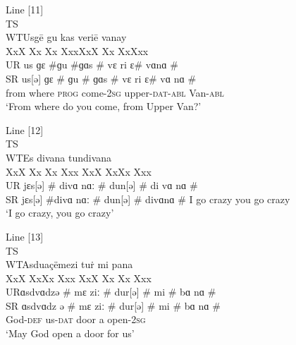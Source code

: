 \documentclass[output=paper,colorlinks,citecolor=brown]{langscibook}
\begin{document}
\begin{paperappendix}
\newpage
\noindent Line [11]\\
TS\tab   {} \\
WT\tab   Usgē \tab  \tab     gu \tab  kas \tab  \tab   veriē \tab \tab      vanay\\
\tab \tab XxX   \tab  Xx \tab  Xx \tab  Xxx\tab  \tab    XxX   \tab   Xx  \tab Xx\tab   Xxx\\ 
UR \tab  us \tab     ɡɛ \#\tab   ɡu \#\tab   ɡɑs \#  \tab   \tab  vɛ ri \tab    ɛ\# \tab  vɑ\tab   nɑ \#\\
SR \tab  us[ə] \tab     ɡɛ \# \tab  ɡu \# \tab  ɡɑs \# \tab  \tab    vɛ ri \tab    ɛ\# \tab  vɑ \tab  nɑ \#\\
\tab \tab from where \tab    \textsc{prog} \tab  come-2\textsc{sg} \tab  upper-\textsc{dat-abl} \tab  Van-\textsc{abl}\\
‘From where do you come, from Upper Van?'\medskip

\noindent Line [12]\\
TS\tab    {} \\  
WT\tab   Es \tab\tab     divana \tab      \tab   tun\tab \tab     divana\\
\tab \tab XxX \tab \tab    Xx \tab  Xx \tab  Xxx  \tab   XxX \tab    \tab Xx\tab   Xx  \tab Xxx\\
UR  \tab jɛs[ə] \# \tab   di\tab   vɑ \tab  nɑː \#  \tab   dun[ə] \# \tab  di \tab  vɑ \tab  nɑ \#\\
SR \tab  jɛs[ə] \#\tab  \tab  di\tab   vɑ \tab  nɑː \# \tab    dun[ə] \# \tab  di\tab   vɑ\tab   nɑ \#\tab 
\tab I  \tab\tab    go crazy  \tab   \tab   you   \tab \tab  go crazy\\
‘I go crazy, you go crazy’\medskip

\noindent Line [13]\\
TS \tab   {} \\ 
WT\tab   Asduaçë\tab   \tab   mezi \tab    \tab   tuṙ \tab   \tab  mi \tab  pana\\
\tab \tab XxX \tab   \tab  Xx\tab   Xx \tab  Xxx \tab    XxX \tab  \tab   Xx \tab  Xx \tab  Xxx\\
UR\tab   ɑsdvɑdz\tab   ə \# \tab  mɛ \tab  ziː \# \tab     dur[ə] \# \tab  mi \# \tab  bɑ \tab  nɑ \#\\
SR \tab  ɑsdvɑdz \tab  ə \# \tab  mɛ \tab  ziː \# \tab     dur[ə] \# \tab  mi \# \tab  bɑ \tab  nɑ \#\\
\tab \tab God-\textsc{def} \tab   \tab  us-\textsc{dat}  \tab   door \tab  \tab   a \tab  open-2\textsc{sg}\\
‘May God open a door for us’\\
\end{paperappendix}
\end{document}
